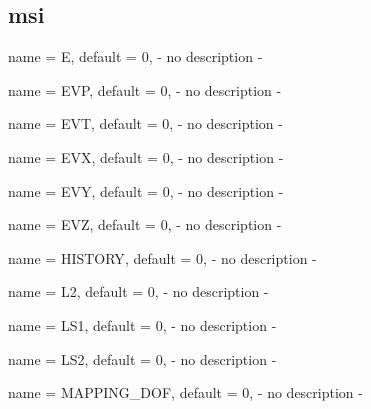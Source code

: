 \subsection{msi}

\begin{parameter}{
    name    = {E},
    default = {0},
}
- no description -
\end{parameter}

\begin{parameter}{
    name    = {EVP},
    default = {0},
}
- no description -
\end{parameter}

\begin{parameter}{
    name    = {EVT},
    default = {0},
}
- no description -
\end{parameter}

\begin{parameter}{
    name    = {EVX},
    default = {0},
}
- no description -
\end{parameter}

\begin{parameter}{
    name    = {EVY},
    default = {0},
}
- no description -
\end{parameter}

\begin{parameter}{
    name    = {EVZ},
    default = {0},
}
- no description -
\end{parameter}

\begin{parameter}{
    name    = {HISTORY},
    default = {0},
}
- no description -
\end{parameter}

\begin{parameter}{
    name    = {L2},
    default = {0},
}
- no description -
\end{parameter}

\begin{parameter}{
    name    = {LS1},
    default = {0},
}
- no description -
\end{parameter}

\begin{parameter}{
    name    = {LS2},
    default = {0},
}
- no description -
\end{parameter}

\begin{parameter}{
    name    = {MAPPING_DOF},
    default = {0},
}
- no description -
\end{parameter}

